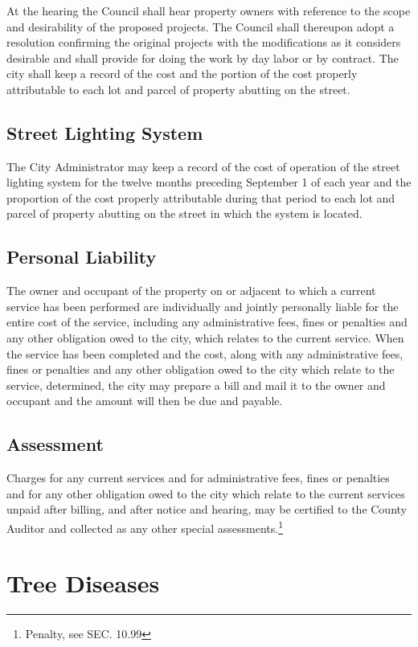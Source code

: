 \subsubsection{}
At the hearing the Council shall hear property owners with reference to the scope and desirability of the proposed projects.  The Council shall thereupon adopt a resolution confirming the original projects with the modifications as it considers desirable and shall provide for doing the work by day labor or by contract.  The city shall keep a record of the cost and the portion of the cost properly attributable to each lot and parcel of property abutting on the street.
\subsection{Street Lighting System}
The City Administrator may keep a record of the cost of operation of the street lighting system for the twelve months preceding September 1 of each year and the proportion of the cost properly attributable during that period to each lot and parcel of property abutting on the street in which the system is located.
\subsection{Personal Liability}
The owner and occupant of the property on or adjacent to which a current service has been performed are individually and jointly personally liable for the entire cost of the service, including any administrative fees, fines or penalties and any other obligation owed to the city, which relates to the current service. When the service has been completed and the cost, along with any administrative fees, fines or penalties and any other obligation owed to the city which relate to the service, determined, the city may prepare a bill and mail it to the owner and occupant and the amount will then be due and payable.
\subsection{Assessment}
Charges for any current services and for administrative fees, fines or penalties and for any other obligation owed to the city which relate to the current services unpaid after billing, and after notice and hearing, may be certified to the County Auditor and collected as any other special assessments.\footnote{Penalty, see SEC. 10.99}

\section{Tree Diseases}
